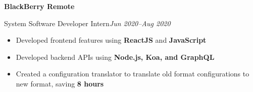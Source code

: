 \textbf{BlackBerry \hfill Remote}\par

System Software Developer Intern\hfill \textit{Jun 2020--Aug 2020}
\begin{itemize}
        \item Developed frontend features using \textbf{ReactJS} and \textbf{JavaScript}
        \item Developed backend APIs using \textbf{Node.js, Koa, and GraphQL}
        \item Created a configuration translator to translate old format configurations to new format, saving \textbf{8 hours}
\end{itemize}
